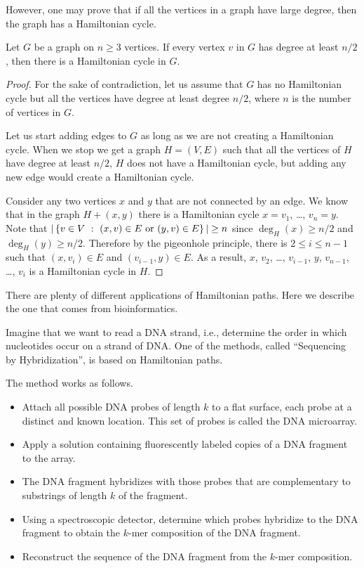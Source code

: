 However, one may prove that if all the vertices in a graph have large degree,
then the graph has a Hamiltonian cycle.
\begin{theorem}[Dirac]
  Let $G$ be a graph on $n \ge 3$ vertices. If every vertex $v$ in $G$ has
  degree at least $n / 2$, then there is a Hamiltonian cycle in $G$.
\end{theorem}
\begin{proof}
  For the sake of contradiction, let us assume that $G$ has no Hamiltonian
  cycle but all the vertices have degree at least degree $n / 2$, where $n$ is
  the number of vertices in $G$.

  Let us start adding edges to $G$ as long as we are not creating a
  Hamiltonian cycle. When we stop we get a graph $H = (V, E)$ such that
  all the vertices of $H$ have degree at least $n / 2$, $H$ does
  not have a Hamiltonian cycle, but adding any new edge would create a
  Hamiltonian cycle.

  Consider any two vertices $x$ and $y$ that are not connected by
  an edge. We know that in the graph $H + (x, y)$ there is
  a Hamiltonian cycle $x = v_1$, \dots, $v_n = y$. Note that
  $|\set[{(x, v) \in E \text{ or } (y, v) \in E}]{v \in V}| \ge n$
  since $\deg_H(x) \ge n / 2$ and $\deg_H(y) \ge n / 2$.
  Therefore by the pigeonhole principle, there is $2 \le i \le n - 1$
  such that $(x, v_i) \in E$ and $(v_{i - 1}, y) \in E$. As a result,
  $x$, $v_2$, \dots, $v_{i - 1}$, $y$, $v_{n - 1}$, \dots, $v_i$
  is a Hamiltonian cycle in $H$.
\end{proof}

There are plenty of different applications of Hamiltonian paths. Here we describe
the one that comes from bioinformatics.

Imagine that we want to read a DNA strand, i.e., determine the order in which
nucleotides occur on a strand of DNA. One of the methods, called
``Sequencing by Hybridization'', is based on Hamiltonian paths.

The method works as follows.
\begin{itemize}
  \item Attach all possible DNA probes of length $k$ to a flat surface, each
    probe at a distinct and known location. This set of probes is called
    the DNA microarray.
  \item Apply a solution containing fluorescently labeled copies of a DNA
    fragment to the array.
  \item The DNA fragment hybridizes with those probes that are
    complementary to substrings of length $k$ of the fragment.
  \item Using a spectroscopic detector, determine which probes hybridize to
    the DNA fragment to obtain the $k$-mer composition of the DNA fragment.
  \item Reconstruct the sequence of the DNA fragment from the $k$-mer
    composition.
\end{itemize}

